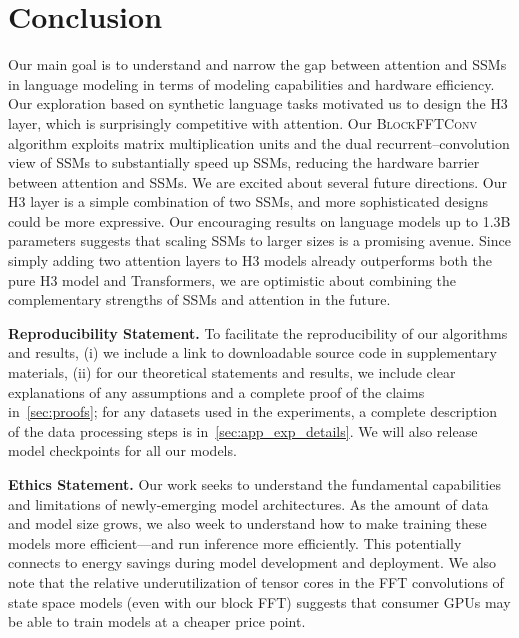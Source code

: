 \documentclass{article}
\newif\ifarxiv
\newcommand{\hthree}{\textsc{H3}\xspace}
\begin{document}
 

\section{Conclusion}
\label{sec:conc}

Our main goal is to understand and narrow the gap between attention and SSMs in
language modeling in terms of modeling capabilities and hardware efficiency.
Our exploration based on synthetic language tasks motivated us to design the
\hthree layer, which is surprisingly competitive with attention.
Our \textsc{BlockFFTConv} algorithm exploits matrix multiplication units and the
dual recurrent--convolution view of SSMs to substantially speed up SSMs, reducing
the hardware barrier between attention and SSMs.
We are excited about several future directions.
Our \hthree layer is a simple combination of two SSMs, and more
sophisticated designs could be more expressive.
Our encouraging results on language models up to 1.3B parameters suggests that
scaling SSMs to larger sizes is a promising avenue.
Since simply adding two attention layers to \hthree models already
outperforms both the pure \hthree model and Transformers, we are optimistic
about combining the complementary strengths of SSMs and attention in the future.

\ifarxiv

\else
\textbf{Reproducibility Statement.} To facilitate the reproducibility of our
algorithms and results, (i) we include a link to downloadable source code in
supplementary materials, (ii) for our theoretical statements and results, we
include clear explanations of any assumptions and a complete proof of the claims
in~\cref{sec:proofs}; for any datasets used in the experiments, a complete description of the data processing steps is in~\cref{sec:app_exp_details}.
We will also release model checkpoints for all our models.

\textbf{Ethics Statement.}
Our work seeks to understand the fundamental capabilities and limitations of newly-emerging model architectures.
As the amount of data and model size grows, we also week to understand how to make training these models more efficient---and run inference more efficiently.
This potentially connects to energy savings during model development and deployment.
We also note that the relative underutilization of tensor cores in the FFT convolutions of state space models (even with our block FFT) suggests that consumer GPUs may be able to train models at a cheaper price point.
\end{document}
